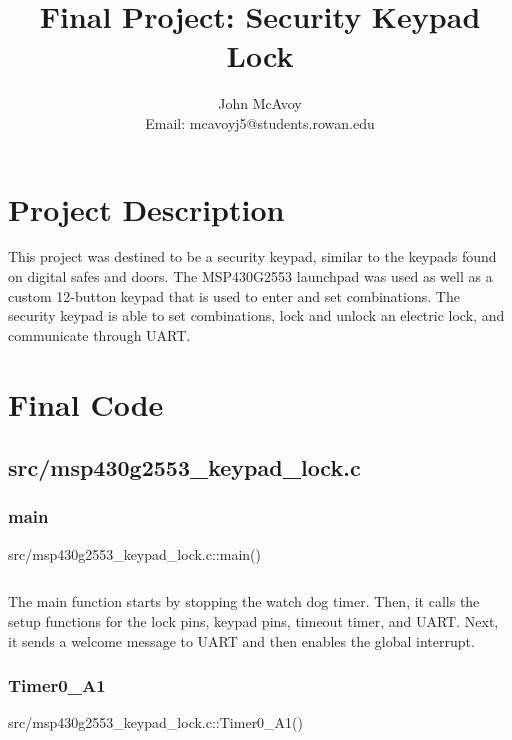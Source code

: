 \documentclass{article}
\begin{document}
\title{Final Project: Security Keypad Lock}
\author{John McAvoy \\
  Email: mcavoyj5@students.rowan.edu}

\maketitle
\tableofcontents

\section{Project Description}
This project was destined to be a security keypad, similar to the keypads found
on digital safes and doors. The MSP430G2553 launchpad was used as well as a
custom 12-button keypad that is used to enter and set combinations. The security
keypad is able to set combinations, lock and unlock an electric lock, and
communicate through UART.

\section{Final Code}

\subsection{src/msp430g2553\_keypad\_lock.c}

\subsubsection{main}

\begin{listing}[H]
  \caption{src/msp430g2553\_keypad\_lock.c::main()}
  \inputminted[linenos,firstline=1, lastline=29]{C}{../msp430g2553/src/msp430g2553_keypad_lock.c}
\end{listing}

The main function starts by stopping the watch dog timer. Then, it calls the
setup functions for the lock pins, keypad pins, timeout timer, and UART. Next,
it sends a welcome message to UART and then enables the global interrupt.

\subsubsection{Timer0\_A1}

\begin{listing}[H]
  \caption{src/msp430g2553\_keypad\_lock.c::Timer0\_A1()}
  \inputminted[linenos,firstline=29, lastline=42]{C}{../msp430g2553/src/msp430g2553_keypad_lock.c}
\end{listing}
\end{document}
